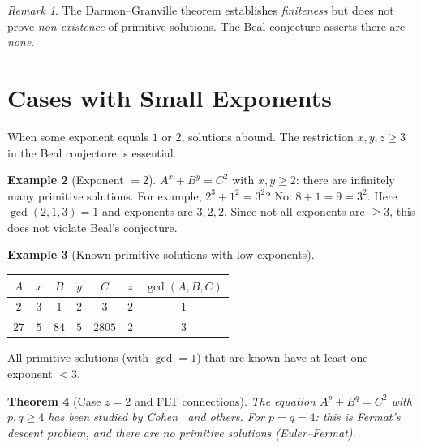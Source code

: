 \documentclass[12pt,a4paper]{amsart}
\newtheorem{theorem}{Theorem}[section]
\theoremstyle{definition}
\newtheorem{example}[theorem]{Example}
\theoremstyle{remark}
\newtheorem{remark}[theorem]{Remark}
\begin{document}
\begin{remark}
The Darmon--Granville theorem establishes \emph{finiteness} but does not prove
\emph{non-existence} of primitive solutions. The Beal conjecture asserts there
are \emph{none}.
\end{remark}

\section{Cases with Small Exponents}

When some exponent equals $1$ or $2$, solutions abound. The restriction $x,y,z \geq 3$
in the Beal conjecture is essential.

\begin{example}[Exponent $= 2$]
$A^x + B^y = C^2$ with $x,y \geq 2$: there are infinitely many primitive solutions.
For example, $2^3 + 1^2 = 3^2$? No: $8 + 1 = 9 = 3^2$. Here $\gcd(2,1,3) = 1$
and exponents are $3, 2, 2$. Since not all exponents are $\geq 3$, this does not
violate Beal's conjecture.
\end{example}

\begin{example}[Known primitive solutions with low exponents]
\begin{center}
\begin{tabular}{ccccccc}
\toprule
$A$ & $x$ & $B$ & $y$ & $C$ & $z$ & $\gcd(A,B,C)$ \\
\midrule
$2$ & $3$ & $1$ & $2$ & $3$ & $2$ & $1$ \\
$27$ & $5$ & $84$ & $5$ & $2805$ & $2$ & $3$ \\
\bottomrule
\end{tabular}
\end{center}
All primitive solutions (with $\gcd = 1$) that are known have at least one exponent $< 3$.
\end{example}

\begin{theorem}[Case $z = 2$ and FLT connections]\label{thm:z2}
The equation $A^p + B^q = C^2$ with $p, q \geq 4$ has been studied by
Cohen~\cite{Cohen07} and others. For $p = q = 4$: this is Fermat's descent
problem, and there are no primitive solutions (Euler--Fermat).
\end{theorem}

\end{document}
